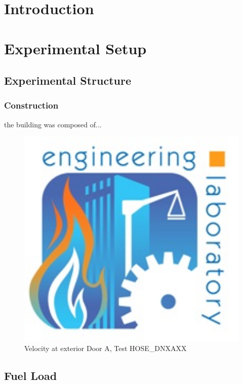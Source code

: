 \documentclass[11pt,oneside]{book}
\begin{document}
\mainmatter

\chapter{Introduction}
\label{chap:Introduction}

\chapter{Experimental Setup}
\label{chap:Experimental_Setup}
\section{Experimental Structure}
\subsection{Construction}
the building was composed of...

\begin{figure}[!ht]
\includegraphics[width=6in]{../Figures/el_logo_small}
\caption{Velocity at exterior Door A, Test HOSE\_DNXAXX}
\label{fig:HOSE_DNXAXX_BDP_A7}
\end{figure}
\section{Fuel Load}
\end{document}
